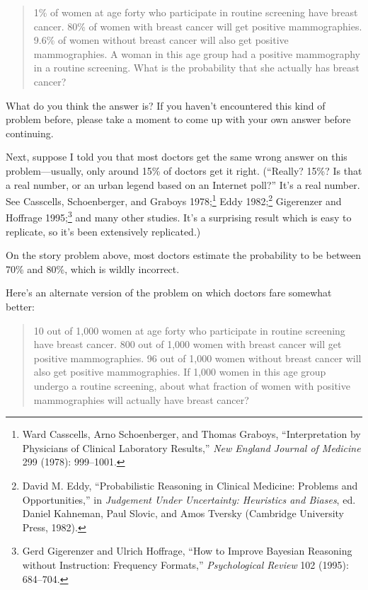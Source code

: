 {\begin{quote}
{
 1\% of women at age forty who participate in routine screening
have breast cancer. 80\% of women with breast cancer will get positive
mammographies. 9.6\% of women without breast cancer will also get
positive mammographies. A woman in this age group had a positive
mammography in a routine screening. What is the probability that she
actually has breast cancer?}
\end{quote}


 What do you think the answer is? If you haven't
encountered this kind of problem before, please take a moment to come
up with your own answer before continuing.

\hr


 Next, suppose I told you that most doctors get the same wrong
answer on this problem---usually, only around 15\% of doctors get it
right. (``Really? 15\%? Is that a real number, or an
urban legend based on an Internet poll?''
It's a real number. See Casscells, Schoenberger, and
Graboys 1978;\footnote{Ward Casscells, Arno Schoenberger, and Thomas Graboys,
``Interpretation by Physicians of Clinical Laboratory
Results,'' \textit{New England Journal of Medicine}
299 (1978): 999--1001.} Eddy 1982;\footnote{David M. Eddy, ``Probabilistic Reasoning in
Clinical Medicine: Problems and Opportunities,'' in
\textit{Judgement Under Uncertainty: Heuristics and Biases}, ed. Daniel
Kahneman, Paul Slovic, and Amos Tversky (Cambridge University Press,
1982).}
Gigerenzer and Hoffrage 1995;\footnote{Gerd Gigerenzer and Ulrich Hoffrage, ``How to
Improve Bayesian Reasoning without Instruction: Frequency
Formats,'' \textit{Psychological Review} 102 (1995):
684--704.} and many other
studies. It's a surprising result which is easy to
replicate, so it's been extensively replicated.)


 On the story problem above, most doctors estimate the probability
to be between 70\% and 80\%, which is wildly incorrect.


 Here's an alternate version of the problem on
which doctors fare somewhat better:

\begin{quote}
{
 10 out of 1,000 women at age forty who participate in routine
screening have breast cancer. 800 out of 1,000 women with breast cancer
will get positive mammographies. 96 out of 1,000 women without breast
cancer will also get positive mammographies. If 1,000 women in this age
group undergo a routine screening, about what fraction of women with
positive mammographies will actually have breast cancer?}
\end{quote}


}
